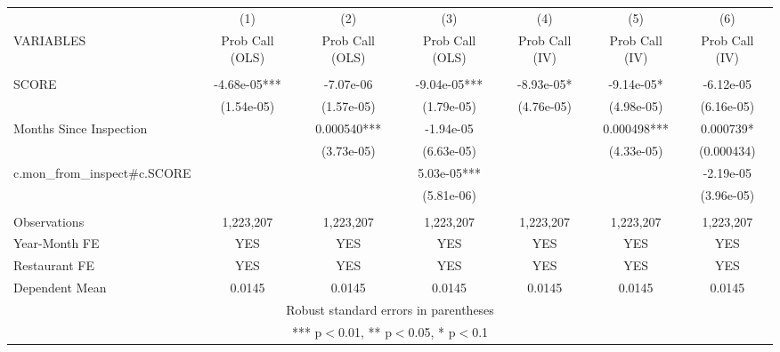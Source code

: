 \begin{tabular}{lcccccc} \hline
 & (1) & (2) & (3) & (4) & (5) & (6) \\
VARIABLES & Prob Call (OLS) & Prob Call (OLS) & Prob Call (OLS) & Prob Call (IV) & Prob Call (IV) & Prob Call (IV) \\ \hline
 &  &  &  &  &  &  \\
SCORE & -4.68e-05*** & -7.07e-06 & -9.04e-05*** & -8.93e-05* & -9.14e-05* & -6.12e-05 \\
 & (1.54e-05) & (1.57e-05) & (1.79e-05) & (4.76e-05) & (4.98e-05) & (6.16e-05) \\
Months Since Inspection &  & 0.000540*** & -1.94e-05 &  & 0.000498*** & 0.000739* \\
 &  & (3.73e-05) & (6.63e-05) &  & (4.33e-05) & (0.000434) \\
c.mon\_from\_inspect\#c.SCORE &  &  & 5.03e-05*** &  &  & -2.19e-05 \\
 &  &  & (5.81e-06) &  &  & (3.96e-05) \\
 &  &  &  &  &  &  \\
Observations & 1,223,207 & 1,223,207 & 1,223,207 & 1,223,207 & 1,223,207 & 1,223,207 \\
Year-Month FE & YES & YES & YES & YES & YES & YES \\
Restaurant FE & YES & YES & YES & YES & YES & YES \\
 Dependent Mean & 0.0145 & 0.0145 & 0.0145 & 0.0145 & 0.0145 & 0.0145 \\ \hline
\multicolumn{7}{c}{ Robust standard errors in parentheses} \\
\multicolumn{7}{c}{ *** p$<$0.01, ** p$<$0.05, * p$<$0.1} \\
\end{tabular}

